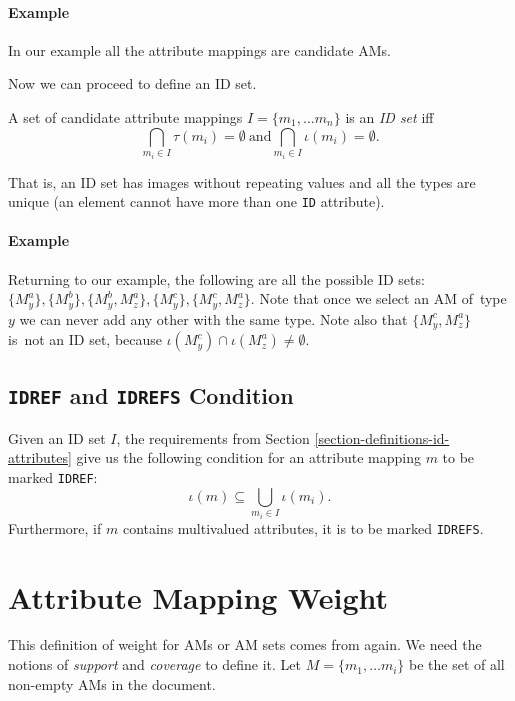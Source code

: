 \paragraph{Example}
In our example all the attribute mappings are candidate AMs.

Now we can proceed to define an ID set.

\begin{define}[ID set]
A set of candidate attribute mappings $I = \{m_1, \ldots m_n\}$ is an \textit{ID set} iff
\[\bigcap_{m_i \in I} \tau(m_i) = \emptyset\:\text{and} \bigcap_{m_i \in I} \iota(m_i) = \emptyset.\]
\end{define}

That is, an ID set has images without repeating values and all the types are unique (an element cannot have more than one \texttt{ID} attribute).

\paragraph{Example}
Returning to our example, the following are all the possible ID sets: $\{ M_{y}^{a} \}, \{ M_{y}^{b} \}, \{ M_{y}^{b}, M_{z}^{a} \}, \{ M_{y}^{c} \}, \{ M_{y}^{c}, M_{z}^{a} \}$. Note that once we select an AM of~type $y$ we can never add any other with the same type. Note also that $\{ M_{y}^{c}, M_{z}^{a} \}$ is~not an ID set, because $\iota(M_{y}^{c}) \cap \iota(M_{z}^{a}) \neq \emptyset$.

\subsection*{\texttt{IDREF} and \texttt{IDREFS} Condition}

Given an ID set $I$, the requirements from Section \ref{section-definitions-id-attributes} give us the following condition for an attribute mapping $m$ to be marked \texttt{IDREF}:
\[\iota(m) \subseteq \bigcup_{m_i \in I} \iota(m_i).\]
Furthermore, if $m$ contains multivalued attributes, it is to be marked \texttt{IDREFS}.

\section{Attribute Mapping Weight}
\label{section-definitions-weight}

This definition of weight for AMs or AM sets comes from \cite{fidax} again. We need the notions of \textit{support} and \textit{coverage} to define it. Let $M = \{m_1, \dots m_i\}$ be the set of all non-empty AMs in the document.

